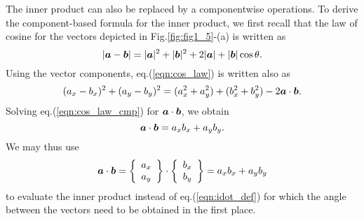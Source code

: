 \documentclass[10pt,a4j]{article}
\begin{document}
The inner product can also be replaced by a componentwise operations.
To derive the component-based formula for the inner product, we first recall that 
the law of cosine for the vectors depicted in Fig.\ref{fig:fig1_5}-(a) is written as 
\begin{equation}
	\left| \mbox{\boldmath $a$}-\mbox{\boldmath $b$}\right|= 
	|\mbox{\boldmath $a$}|^2+|\mbox{\boldmath $b$}|^2
	+
	2|\mbox{\boldmath $a$}|+|\mbox{\boldmath $b$}| \cos\theta
	.
	\label{eqn:cos_law}
\end{equation}
Using the vector components, eq.(\ref{eqn:cos_law}) is written also as 
\begin{equation}
	(a_x-b_x)^2+(a_y-b_y)^2
	=
	(a_x^2+a_y^2)+(b_x^2+b_y^2) -2\mbox{\boldmath $a$}\cdot\mbox{\boldmath $b$}.
	\label{eqn:cos_law_cmp}
\end{equation}
Solving eq.(\ref{eqn:cos_law_cmp}) for $\mbox{\boldmath $a$}\cdot\mbox{\boldmath $b$}$, we obtain
\begin{equation}
	\mbox{\boldmath $a$}\cdot\mbox{\boldmath $b$}=a_xb_x+a_yb_y.
	\label{eqn:}
\end{equation}
We may thus use 
\begin{equation}
	\mbox{\boldmath $a$} \cdot \mbox{\boldmath $b$}
	=
	\left\{
		\begin{array}{c}
			a_x \\
			a_y 
		\end{array}
	\right\}
	\cdot
	\left\{
		\begin{array}{c}
			b_x \\
			b_y 
		\end{array}
	\right\}
	= a_xb_x+a_yb_y
	\label{eqn:}
\end{equation}
to evaluate the inner product instead of eq.(\ref{eqn:idot_def}) for which the angle 
between the vectors need to be obtained in the first place. 
\end{document}
